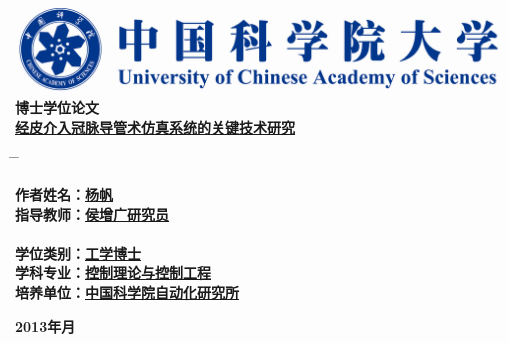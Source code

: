 \vspace*{1.2cm} %
\begin{center}
  \includegraphics[width=13.5cm]{../Figures/UCAS}\\
\vspace{1.7cm} {\yihao \hei \textbf{博士学位论文}}\\
\vspace{2.4cm}
{\xiaoerhao \song \underline{\textbf{经皮介入冠脉导管术仿真系统的关键技术研究}}}\\
\end{center}
\sanhao \vspace{3.1cm}
\begin{tabbing}
\hspace*{-0.8cm} \= \hspace{6.4cm} \= \kill

\>\textbf{作者姓名：\underline{\hspace{4.8cm}杨\;\;\;\;帆\;\;\hspace{6.3cm}}}\\
\>\textbf{指导教师：\underline{\hspace{4.8cm}侯增广\;\;研究员\hspace{4.6cm}}}\\
\>\hspace*{2.8cm}\underline{\hspace{13.1cm}} \\

\>\textbf{学位类别：\underline{\hspace{4.8cm}工学博士\hspace{6.0cm}}}\\

\>\textbf{学科专业：\underline{\hspace{3.55cm}控制理论与控制工程\hspace{4.5cm}}}\\


\>\textbf{培养单位：\underline{\hspace{3cm}中国科学院自动化研究所 \hspace{4cm}}}\\

\end{tabbing}
\begin{center}
\vspace{1.0cm}
  \textbf{2013\;\;年\;\;\;月}
\end{center}

